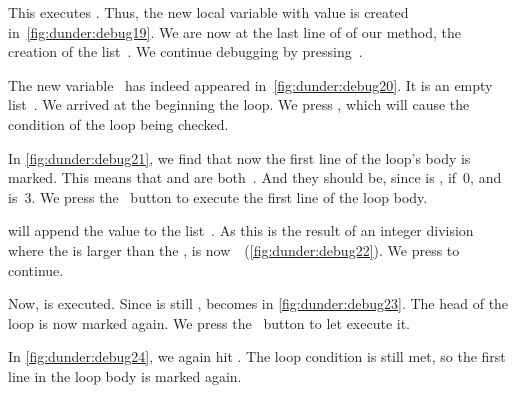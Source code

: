 This executes .
Thus, the new local variable  with value  is created in~\cref{fig:dunder:debug19}.
We are now at the last line of  of our  method, the creation of the list~.
We continue debugging by pressing~.

The new variable~ has indeed appeared in~\cref{fig:dunder:debug20}.
It is an empty list~\pythonil{[]}.
We arrived at the beginning the  loop.
We press , which will cause the condition of the loop being checked.

In \cref{fig:dunder:debug21}, we find that now the first line of the loop's body is marked.
This means that  and  are both~.
And they should be, since  is ,  if~0, and  is~3.
We press the \pycharmDebuggerStepOver~button to execute the first line of the loop body.

 will append the value  to the list~.
As this is the result of an integer division where the  is larger than the ,  is now~\pythonil{[0]}~(\cref{fig:dunder:debug22}).
We press  to continue.

Now,  is executed.
Since  is still ,  becomes  in \cref{fig:dunder:debug23}.
The head of the loop is now marked again.
We press the \pycharmDebuggerStepOver~button to let execute it.

In \cref{fig:dunder:debug24}, we again hit .
The loop condition is still met, so the first line in the loop body is marked again.

